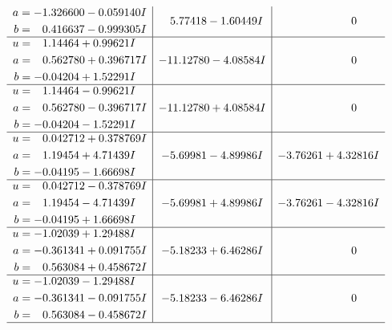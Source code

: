 \documentclass[1p]{elsarticle_modified}
\theoremstyle{definition}
\begin{document}
$$\begin{array}{c|c|c}
\begin{aligned}
a &= -1.326600 - 0.059140 I \\
b &= \phantom{-}0.416637 - 0.999305 I\end{aligned}
 & \phantom{-}5.77418 - 1.60449 I & \phantom{-0.000000 } 0 \\ \hline\begin{aligned}
u &= \phantom{-}1.14464 + 0.99621 I \\
a &= \phantom{-}0.562780 + 0.396717 I \\
b &= -0.04204 + 1.52291 I\end{aligned}
 & -11.12780 - 4.08584 I & \phantom{-0.000000 } 0 \\ \hline\begin{aligned}
u &= \phantom{-}1.14464 - 0.99621 I \\
a &= \phantom{-}0.562780 - 0.396717 I \\
b &= -0.04204 - 1.52291 I\end{aligned}
 & -11.12780 + 4.08584 I & \phantom{-0.000000 } 0 \\ \hline\begin{aligned}
u &= \phantom{-}0.042712 + 0.378769 I \\
a &= \phantom{-}1.19454 + 4.71439 I \\
b &= -0.04195 - 1.66698 I\end{aligned}
 & -5.69981 - 4.89986 I & -3.76261 + 4.32816 I \\ \hline\begin{aligned}
u &= \phantom{-}0.042712 - 0.378769 I \\
a &= \phantom{-}1.19454 - 4.71439 I \\
b &= -0.04195 + 1.66698 I\end{aligned}
 & -5.69981 + 4.89986 I & -3.76261 - 4.32816 I \\ \hline\begin{aligned}
u &= -1.02039 + 1.29488 I \\
a &= -0.361341 + 0.091755 I \\
b &= \phantom{-}0.563084 + 0.458672 I\end{aligned}
 & -5.18233 + 6.46286 I & \phantom{-0.000000 } 0 \\ \hline\begin{aligned}
u &= -1.02039 - 1.29488 I \\
a &= -0.361341 - 0.091755 I \\
b &= \phantom{-}0.563084 - 0.458672 I\end{aligned}
 & -5.18233 - 6.46286 I & \phantom{-0.000000 } 0\\
 \hline 
 \end{array}$$\newpage
\end{document}
